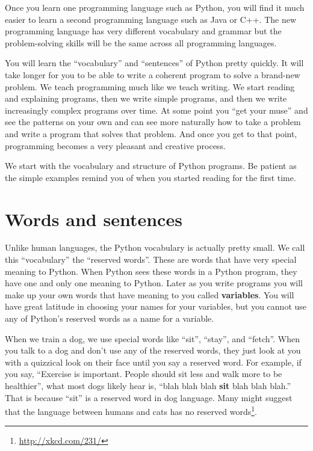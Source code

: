 Once you learn one programming language such as Python, you will 
find it much easier to learn a second programming language such
as Java or C++.  The new programming language has very different 
vocabulary and grammar but the problem-solving skills 
will be the same across all programming languages.

You will learn the ``vocabulary'' and ``sentences'' of Python pretty quickly.
It will take longer for you to be able to write a coherent program
to solve a brand-new problem.  We teach programming much like we teach
writing.  We start reading and explaining programs, then we write 
simple programs, and then we write increasingly complex programs over time.
At some point you ``get your muse'' and see the patterns on your own
and can see more naturally how to take a problem and 
write a program that solves that problem.  And once you get 
to that point, programming becomes a very pleasant and creative process.  

We start with the vocabulary and structure of Python programs.  Be patient
as the simple examples remind you of when you started reading for the first
time. 

\section{Words and sentences}

Unlike human languages, the Python vocabulary is actually pretty small.
We call this ``vocabulary'' the ``reserved words''.  These are words that
have very special meaning to Python.  When Python sees these words in 
a Python program, they have one and only one meaning to Python.  Later
as you write programs you will make up your own words that have meaning to 
you called {\bf variables}.   You will have great latitude in choosing
your names for your variables, but you cannot use any of Python's 
reserved words as a name for a variable.


When we train a dog, we use special words like
``sit'', ``stay'', and ``fetch''.  When you talk to a dog and
don't use any of the reserved words, they just look at you with a 
quizzical look on their face until you say a reserved word.  
For example, if you say, 
``Exercise is important. People should sit less and walk more to be healthier'', 
what most dogs likely hear is,
``blah blah blah {\bf sit} blah blah blah.''
That is because ``sit'' is a reserved word in dog language.  Many
might suggest that the language between humans and cats has no
reserved words\footnote{\url{http://xkcd.com/231/}}.

